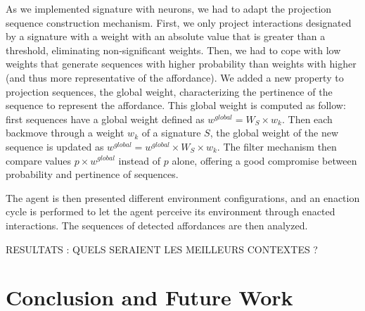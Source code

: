\documentclass[conference]{IEEEtran}
\begin{document}
As we implemented signature with neurons, we had to adapt the projection sequence construction mechanism. First, we only project interactions designated by a signature with a weight with an absolute value that is greater than a threshold, eliminating non-significant weights. Then, we had to cope with low weights that generate sequences with higher probability than weights with higher (and thus more representative of the affordance). We added a new property to projection sequences, the global weight, characterizing the pertinence of the sequence to represent the affordance. This global weight is computed as follow: first sequences have a global weight defined as $w^{global} = W_S \times w_k$. Then each backmove through a weight $w_k$ of a signature $S$, the global weight of the new sequence is updated as $w^{global}=w^{global} \times  W_S \times w_k$. The filter mechanism then compare values $p \times w^{global}$ instead of $p$ alone, offering a good compromise between probability and pertinence of sequences.





The agent is then presented different environment configurations, and an enaction cycle is performed to let the agent perceive its environment through enacted interactions. The sequences of detected affordances are then analyzed.




RESULTATS : QUELS SERAIENT LES MEILLEURS CONTEXTES ?



\section{Conclusion and Future Work}
\end{document}

